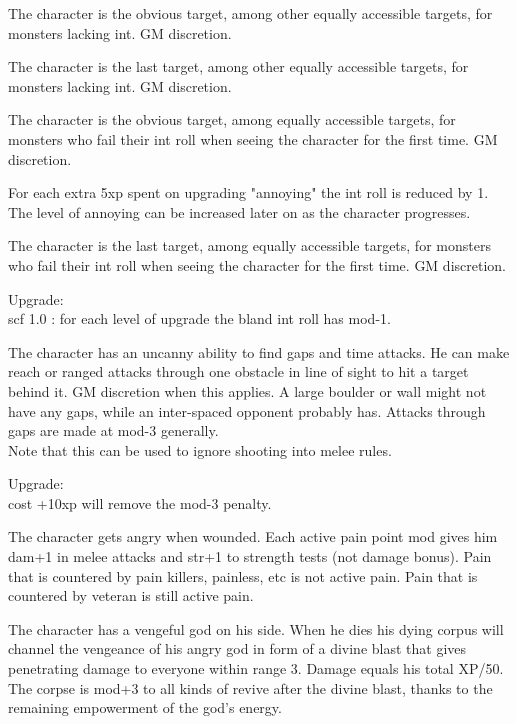  The character is the obvious target, among other equally accessible targets, for monsters lacking int. GM discretion.


 The character is the last target, among other equally accessible targets, for monsters lacking int. GM discretion.


 The character is the obvious target, among equally accessible targets, for monsters who fail their int roll when seeing the character for the first time. GM discretion.

For each extra 5xp spent on upgrading "annoying" the int roll is reduced by 1. The level of annoying can be increased later on as the character progresses.


  The character is the last target, among equally accessible targets, for monsters who fail their int roll when seeing the character for the first time. GM discretion.

Upgrade:\\
scf 1.0 : for each level of upgrade the bland int roll has mod-1.


 The character has an uncanny ability to find gaps and time attacks. He can make reach or ranged attacks through one obstacle in line of sight to hit a target behind it. GM discretion when this applies. A large boulder or wall might not have any gaps, while an inter-spaced opponent probably has. Attacks through gaps are made at mod-3 generally. \\
Note that this can be used to ignore shooting into melee rules.

Upgrade: \\
cost +10xp will remove the mod-3 penalty.


 The character gets angry when wounded. Each active pain point mod gives him dam+1 in melee attacks and str+1 to strength tests (not damage bonus). Pain that is countered by pain killers, painless, etc is not active pain. Pain that is countered by veteran is still active pain.


 The character has a vengeful god on his side. When he dies his dying corpus will channel the vengeance of his angry god in form of a divine blast that gives penetrating damage to everyone within range 3. Damage equals his total XP/50. The corpse is mod+3 to all kinds of revive after the divine blast, thanks to the remaining empowerment of the god's energy.

